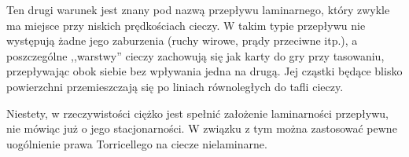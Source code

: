 Ten drugi warunek jest znany pod nazwą przepływu laminarnego, który zwykle ma miejsce przy niskich prędkościach cieczy. W takim typie przepływu nie występują żadne jego zaburzenia (ruchy wirowe, prądy przeciwne itp.), a poszczególne ,,warstwy'' cieczy zachowują się jak karty do gry przy tasowaniu, przepływając obok siebie bez wpływania jedna na drugą. Jej cząstki będące blisko powierzchni przemieszczają się po liniach równoległych do tafli cieczy.

Niestety, w rzeczywistości ciężko jest spełnić założenie laminarności przepływu, nie mówiąc już o jego stacjonarności. W związku z tym można zastosować pewne uogólnienie prawa Torricellego na ciecze nielaminarne. 

